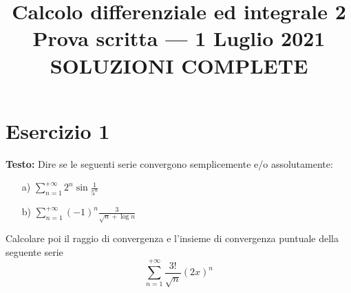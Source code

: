\documentclass[12pt, a4paper]{article}
\title{Calcolo differenziale ed integrale 2 \\ Prova scritta --- 1 Luglio 2021 \\ \textbf{SOLUZIONI COMPLETE}}
\author{}
\date{}
\begin{document}
\maketitle

\section*{Esercizio 1}

\textbf{Testo:} Dire se le seguenti serie convergono semplicemente e/o assolutamente:
\begin{enumerate}
    \item[a)] $\displaystyle\sum_{n=1}^{+\infty} 2^{n} \sin\frac{1}{5^{n}}$
    \item[b)] $\displaystyle\sum_{n=1}^{+\infty} (-1)^{n} \frac{3}{\sqrt{n} + \log n}$
\end{enumerate}
Calcolare poi il raggio di convergenza e l'insieme di convergenza puntuale della seguente serie
\[ \sum_{n=1}^{+\infty} \frac{3!}{\sqrt{n}}(2x)^{n} \]
\end{document}
